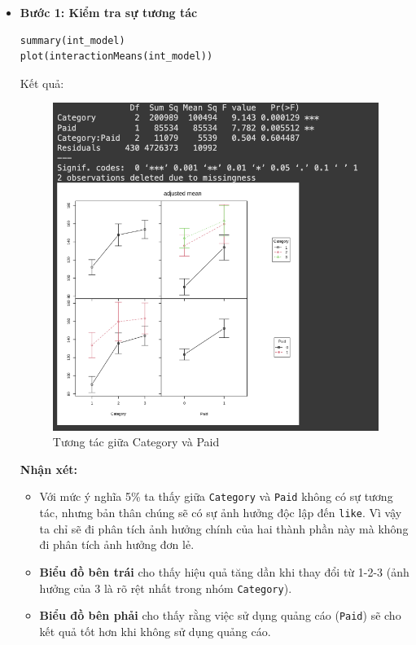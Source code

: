 \begin{itemize}
    \item \textbf{Bước 1: Kiểm tra sự tương tác }
    \begin{lstlisting}
summary(int_model)
plot(interactionMeans(int_model))
    \end{lstlisting}

Kết quả:
\begin{figure}[H]
    \centering
    \includegraphics[width=0.8\linewidth]{part23_figures/26.png}
    \caption{Tương tác giữa Category và Paid}
    \label{fig:Tương tác giữa Category và Paid}
\end{figure}

\textbf{Nhận xét:}

    \begin{itemize}
        \item Với mức ý nghĩa 5\% ta thấy giữa \texttt{Category} và \texttt{Paid} không có sự tương tác, nhưng bản thân chúng sẽ có sự ảnh hưởng độc lập đến \texttt{like}. Vì vậy ta chỉ sẽ đi phân tích ảnh hưởng chính của hai thành phần này mà không đi phân tích ảnh hưởng đơn lẻ.
        
        \item \textbf{Biểu đồ bên trái} cho thấy hiệu quả tăng dần khi thay đổi từ 1-2-3 (ảnh hưởng của 3 là rõ rệt nhất trong nhóm \texttt{Category}).
        
        \item \textbf{Biểu đồ bên phải} cho thấy rằng việc sử dụng quảng cáo (\texttt{Paid}) sẽ cho kết quả tốt hơn khi không sử dụng quảng cáo.
    \end{itemize}



\end{itemize}
